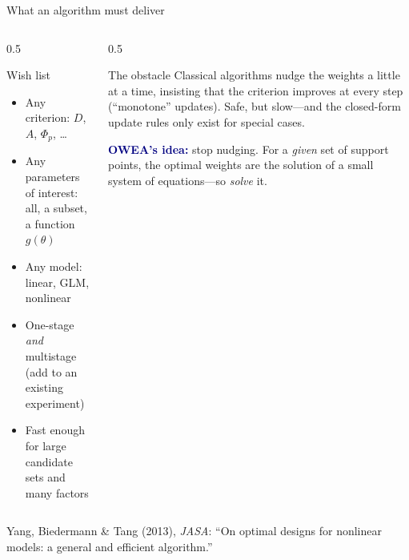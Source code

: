 \documentclass[aspectratio=169,10pt]{beamer}
\newcommand{\key}[1]{\textcolor{navy}{\textbf{#1}}}
\begin{document}
\begin{frame}{What an algorithm must deliver}
  \begin{columns}[T]
    \begin{column}{0.5\textwidth}
      \begin{block}{Wish list}
        \begin{itemize}
          \item Any criterion: $D$, $A$, $\Phi_p$, \ldots
          \item Any parameters of interest: all, a subset, a function $g(\theta)$
          \item Any model: linear, GLM, nonlinear
          \item One-stage \emph{and} multistage (add to an existing experiment)
          \item Fast enough for large candidate sets and many factors
        \end{itemize}
      \end{block}
    \end{column}
    \begin{column}{0.5\textwidth}
      \begin{alertblock}{The obstacle}
        Classical algorithms nudge the weights a little at a time, insisting that the criterion improves
        at every step (``monotone'' updates). Safe, but slow---and the closed-form update rules only exist for special cases.
      \end{alertblock}
      \vspace{0.5em}
      \key{OWEA's idea:} stop nudging. For a \emph{given} set of support points, the optimal weights are the solution of a
      small system of equations---so \emph{solve} it.
    \end{column}
  \end{columns}
  \vspace{0.4em}
  \footnotesize Yang, Biedermann \& Tang (2013), \emph{JASA}: ``On optimal designs for nonlinear models: a general and efficient algorithm.''
\end{frame}
\end{document}
